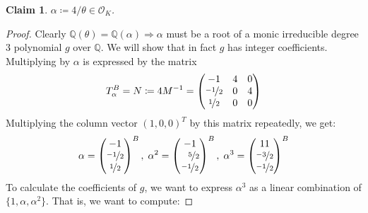 \documentclass[11pt]{article}
\newtheorem{claim}[theorem]{Claim}
\theoremstyle{definition}
\begin{document}
    \begin{claim}
        $\alpha \coloneqq 4/\theta \in \mathcal{O}_K$.
    \end{claim}
    \begin{proof}

        Clearly $\mathbb{Q}(\theta) = \mathbb{Q}(\alpha) \Rightarrow \alpha$ must be a root of a monic irreducible degree $3$ polynomial $g$ over $\mathbb{Q}$.
        We will show that in fact $g$ has integer coefficients.
        Multiplying by $\alpha$ is expressed by the matrix
        \[T_{\alpha}^{B} = N \coloneqq 4M^{-1} =
            \begin{pmatrix}
                -1 & 4 & 0 \\
                \nicefrac{-1}{2} & 0 & 4 \\
                \nicefrac{1}{2} &  0 & 0
            \end{pmatrix}
        \]
        Multiplying the column vector $(1, 0, 0)^T$ by this matrix repeatedly,
        we get:
        \begin{align}\label{eq:alpha}
            \alpha = \begin{pmatrix}
                -1 \\
                \nicefrac{-1}{2} \\
                \nicefrac{1}{2}
            \end{pmatrix}^B,\;
            \alpha^2 = \begin{pmatrix}
                -1 \\
                \phantom{-}\nicefrac{5}{2} \\
                \nicefrac{-1}{2}
            \end{pmatrix}^B,\;
            \alpha^3 = \begin{pmatrix}
                11 \\
                \nicefrac{-3}{2} \\
                \nicefrac{-1}{2}
            \end{pmatrix}^B
        \end{align}
        To calculate the coefficients of $g$, we want to express $\alpha^3$ as a linear combination of $\{1, \alpha, \alpha^2\}$.
        That is, we want to compute:


\end{proof}
\end{document}
